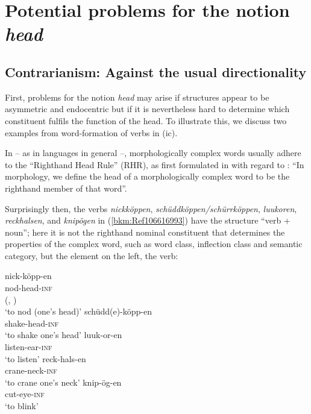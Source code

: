 \documentclass[output=paper
  ,nobabel
  ,draftmode
  ,colorlinks, citecolor=brown
]{langscibook}
\begin{document}
\section{Potential problems for the notion \emph{head}}

\subsection{Contrarianism: Against the usual directionality} 

First, problems for the notion \emph{head} may arise if structures appear to be asymmetric and
endocentric but if it is nevertheless hard to determine which constituent fulfils the function of
the head. To illustrate this, we discuss two examples from word-formation of verbs in (ic).

In  – as in  languages in general –, morphologically complex words usually adhere to
the ``Righthand Head Rule'' (RHR), as first formulated in \citet[248]{Williams1981} with regard to
: “In morphology, we define the head of a morphologically complex word to be the righthand
member of that word''.

Surprisingly then, the  verbs \emph{nickköppen}, \emph{schüddköppen/schürrköppen},
\emph{luukoren}, \emph{reckhalsen}, and \emph{knipögen} in (\ref{bkm:Ref106616993}) have the
structure “verb + noun''; here it is not the righthand nominal constituent that determines the
properties of the complex word, such as word class, inflection class and semantic category, but the
element on the left, the verb:

\eal
\label{bkm:Ref106388120}\label{bkm:Ref106616993}
\ex
\gll nick-köpp-en\\
     nod-head-\textsc{inf} \\\hfill(, \citealt[50--52]{AsdahlHolmberg1973})\\
\glt `to nod (one's head)'
\ex
\gll schüdd(e)-köpp-en\\
     shake-head-\textsc{inf} \\
\glt `to shake one's head'
\ex
\gll luuk-or-en\\
       listen-ear-\textsc{inf} \\
\glt   `to listen'
\ex 
\gll reck-hals-en\\
       crane-neck-\textsc{inf} \\
\glt   `to crane one's neck'
\ex
\gll knip-ög-en\\
       cut-eye-\textsc{inf} \\
\glt   `to blink'
\zl
\end{document}
